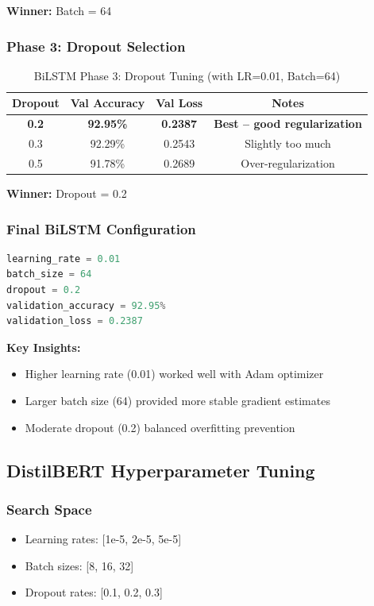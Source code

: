 \documentclass[12pt,a4paper]{article}
\begin{document}
\textbf{Winner:} Batch = 64

\subsubsection{Phase 3: Dropout Selection}
\begin{table}[H]
\centering
\begin{tabular}{@{}cccc@{}}
\toprule
\textbf{Dropout} & \textbf{Val Accuracy} & \textbf{Val Loss} & \textbf{Notes} \\ \midrule
\rowcolor{green!20}\textbf{0.2} & \textbf{92.95\%} & \textbf{0.2387} & \textbf{Best -- good regularization} \\
0.3 & 92.29\% & 0.2543 & Slightly too much \\
0.5 & 91.78\% & 0.2689 & Over-regularization \\ \bottomrule
\end{tabular}
\caption{BiLSTM Phase 3: Dropout Tuning (with LR=0.01, Batch=64)}
\label{tab:bilstm_dropout}
\end{table}

\textbf{Winner:} Dropout = 0.2

\subsubsection{Final BiLSTM Configuration}
\begin{lstlisting}[language=Python, caption={Best BiLSTM Hyperparameters}]
learning_rate = 0.01
batch_size = 64
dropout = 0.2
validation_accuracy = 92.95%
validation_loss = 0.2387
\end{lstlisting}

\textbf{Key Insights:}
\begin{itemize}
    \item Higher learning rate (0.01) worked well with Adam optimizer
    \item Larger batch size (64) provided more stable gradient estimates
    \item Moderate dropout (0.2) balanced overfitting prevention
\end{itemize}

\subsection{DistilBERT Hyperparameter Tuning}

\subsubsection{Search Space}
\begin{itemize}
    \item Learning rates: [1e-5, 2e-5, 5e-5]
    \item Batch sizes: [8, 16, 32]
    \item Dropout rates: [0.1, 0.2, 0.3]
\end{itemize}
\end{document}
